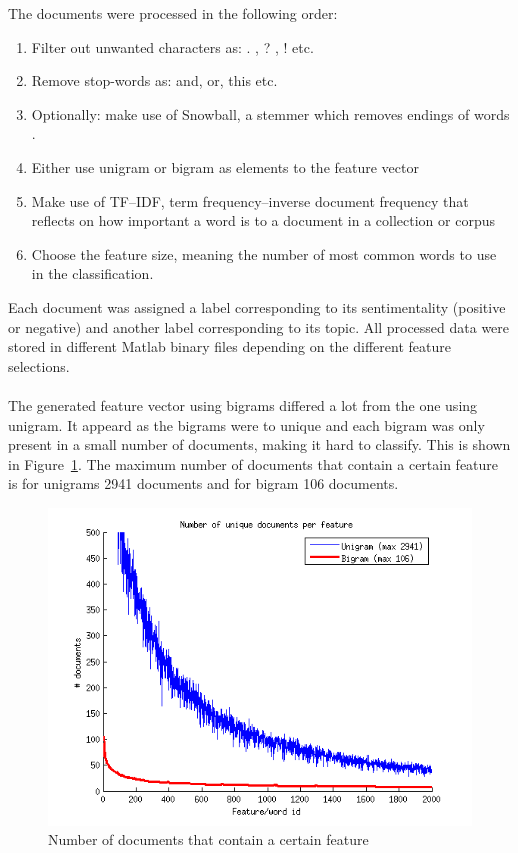 The documents were processed in the following order:
\begin{enumerate}
\item Filter out unwanted characters as: . , ? , ! etc.
\item Remove stop-words as: and, or, this etc.
\item Optionally: make use of Snowball, a stemmer which removes endings of
words \citep{snowball_url}.
\item Either use unigram or bigram as elements to the feature vector
\item Make use of TF–IDF, term frequency–inverse document frequency that
reflects on how important a word is to a document in a collection or corpus
\item Choose the feature size, meaning the number of most common words to use
 in the classification.
\end{enumerate}
Each document was assigned a label corresponding to its sentimentality
(positive or negative) and another label corresponding to its topic.
All processed data were stored in different Matlab binary files depending on the
different feature selections.
\\\\
The generated feature vector using bigrams differed a lot from the one using
unigram. It appeard as the bigrams were to unique and each bigram was only
present in a small number of documents, making it hard to classify.  This is
shown in Figure~\ref{fig:docperfeature}. The maximum number of documents that contain a certain feature is for unigrams 2941 documents and for bigram 106 documents.
\begin{figure}[h!]
\centering
        \includegraphics[scale = 0.6]{../Plottar/documents_per_feature.png}
\caption{Number of documents that contain a certain feature}
\label{fig:docperfeature}
\end{figure}

